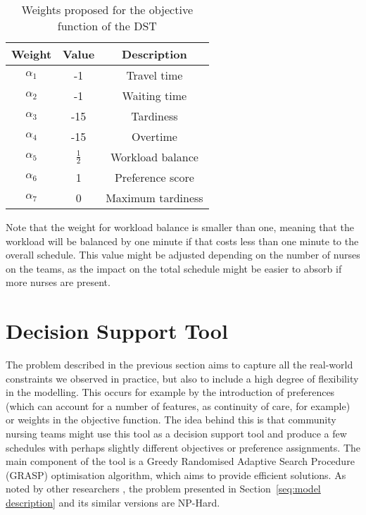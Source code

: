 \documentclass[a4paper,11pt]{elsarticle}
\begin{document}
\begin{table}[htbp!]
    \centering
    \caption{Weights proposed for the objective function of the DST}
    \begin{tabular}{ccc}
    \hline
    \textbf{Weight}  & \textbf{Value} & \textbf{Description} \\
    \hline
    $\alpha_1$      &   -1   &   Travel time \\
    $\alpha_2$      &   -1   &   Waiting time \\
    $\alpha_3$      &   -15   &   Tardiness \\
    $\alpha_4$      &   -15   &   Overtime \\   
    $\alpha_5$      &   $\frac{1}{2}$   &   Workload balance \\       
    $\alpha_6$      &   1   &   Preference score \\    
    $\alpha_7$      &   0   &   Maximum tardiness\\    
    \hline
    \end{tabular}
    \label{tab:adequate_weights}
\end{table}

Note that the weight for workload balance is smaller than one, meaning that the workload will be balanced by one minute if that costs less than one minute to the overall schedule. This value might be adjusted depending on the number of nurses on the teams, as the impact on the total schedule might be easier to absorb if more nurses are present.


\section{Decision Support Tool}\label{seq:DSS}

The problem described in the previous section aims to capture all the real-world constraints we observed in practice, but also to include a high degree of flexibility in the modelling. This occurs for example by the introduction of preferences (which can account for a number of features, as continuity of care, for example) or weights in the objective function. The idea behind this is that community nursing teams might use this tool as a decision support tool and produce a few schedules with perhaps slightly different objectives or preference assignments. The main component of the tool is a Greedy Randomised Adaptive Search Procedure (GRASP) optimisation algorithm, which aims to provide efficient solutions. As noted by other researchers \cite[\eg][]{BERTELS20062866, Rasmussen2012, Mankowska2014}, the problem presented in Section~\ref{seq:model description} and its similar versions are NP-Hard.
\end{document}
